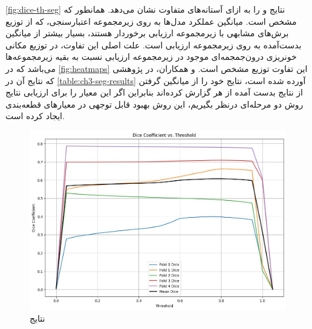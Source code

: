  \autoref{fig:dice-th-seg}
 نتایج 
  و 
 را به ازای آستانه‌های متفاوت نشان می‌دهد. همانطور که مشخص است. میانگین عملکرد مدل‌ها به روی زیرمجموعه اعتبارسنجی، که از توزیع برش‌های مشابهی با زیرمجموعه ارزیابی برخوردار هستند، بسیار بیشتر از میانگین بدست‌آمده به روی زیرمجموعه ارزیابی است. علت اصلی این تفاوت، در توزیع مکانی خونریزی درون‌جمجمه‌ای موجود در زیرمجموعه ارزیابی نسبت به بقیه زیر‌مجموعه‌ها می‌باشد که در 
 \autoref{fig:heatmaps}
 این تفاوت توزیع مشخص است. 
 \cite{hssayeni2020intracranial} 
 و همکاران، در پژوهشی که نتایج آن در
 \autoref{table:ch3-seg-results}
 آورده شده است، نتایج خود را از میانگین گرفتن از نتایج بدست آمده از هر
 گزارش کرده‌اند بنابراین اگر این معیار را برای ارزیابی نتایج روش دو مرحله‌ای درنظر بگیریم، این روش بهبود قابل توجهی در معیارهای قطعه‌بندی ایجاد کرده است.
 
 
\begin{figure}[h]
\centering
\includegraphics[width=1.0\linewidth]{Images/Chapter3/dice-th-seg}
\caption{نتایج}
\label{fig:dice-th-seg}
\end{figure}
 
 
 